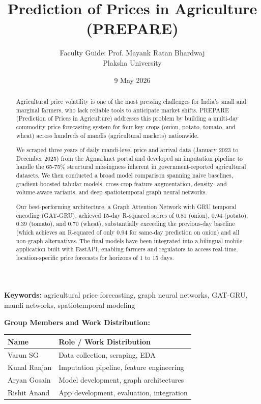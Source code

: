 \documentclass[12pt]{article}
\title{Prediction of Prices in Agriculture (PREPARE)}
\author{
Faculty Guide: Prof. Mayank Ratan Bhardwaj\\
Plaksha University
}
\date{9 May 2026}
\begin{document}
\maketitle

\begin{abstract}

Agricultural price volatility is one of the most pressing challenges for India's small and marginal farmers, who lack reliable tools to anticipate market shifts. PREPARE (Prediction of Prices in Agriculture) addresses this problem by building a multi-day commodity price forecasting system for four key crops (onion, potato, tomato, and wheat) across hundreds of mandis (agricultural markets) nationwide.

We scraped three years of daily mandi-level price and arrival data (January 2023 to December 2025) from the Agmarknet portal and developed an imputation pipeline to handle the 65-75\% structural missingness inherent in government-reported agricultural datasets. We then conducted a broad model comparison spanning naive baselines, gradient-boosted tabular models, cross-crop feature augmentation, density- and volume-aware variants, and deep spatiotemporal graph neural networks.

Our best-performing architecture, a Graph Attention Network with GRU temporal encoding (GAT-GRU), achieved 15-day R-squared scores of 0.81 (onion), 0.94 (potato), 0.39 (tomato), and 0.70 (wheat), substantially exceeding the previous-day baseline (which achieves an R-squared of only 0.94 for same-day prediction on onion) and all non-graph alternatives. The final models have been integrated into a bilingual mobile application built with FastAPI, enabling farmers and regulators to access real-time, location-specific price forecasts for horizons of 1 to 15 days.

\end{abstract}

\noindent\textbf{Keywords:} agricultural price forecasting, graph neural networks, GAT-GRU, mandi networks, spatiotemporal modeling

\textbf{Group Members and Work Distribution:}

\begin{table}[H]
\centering
\begin{tabularx}{\textwidth}{|>{\raggedright\arraybackslash}X|>{\raggedright\arraybackslash}X|}
\hline
Name & Role / Work Distribution \\
\hline
Varun SG & Data collection, scraping, EDA \\
\hline
Kunal Ranjan & Imputation pipeline, feature engineering \\
\hline
Aryan Gosain & Model development, graph architectures \\
\hline
Rishit Anand & App development, evaluation, integration \\
\hline
\end{tabularx}
\end{table}
\end{document}
